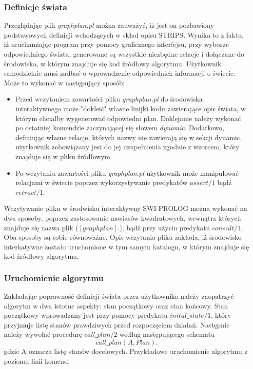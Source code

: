     \subsubsection{Definicje świata}
    Przeglądając plik \textit{graphplan.pl} można zauważyć, iż jest on pozbawiony podstawowych definicji wchodzących w skład opisu STRIPS. Wynika 
    to z faktu, iż uruchamiając program przy pomocy graficznego interfejsu, przy wyborze odpowiedniego świata, 
    generowane są wszystkie niezbędne relacje i dołączane do środowiska, w którym znajduje się kod źródłowy algorytmu.
    Użytkownik samodzielnie musi zadbać o wprowadzenie odpowiednich informacji o świecie. Może to wykonać w następujący sposób:
    \begin{itemize}
        \item Przed wczytaniem zawartości pliku \textit{graphplan.pl} do środowiska interaktywnego może "dokleić" własne linijki kodu 
        zawierające opis świata, w którym chciałby wygenerować odpowiedni plan. Doklejanie należy wykonać po ostatniej komendzie zaczynającej 
        się słowem \textit{dynamic}. Dodatkowo, definiując własne relacje, których nazwy nie zawierają się w sekcji dynamic, użytkownik 
        zobowiązany jest do jej uzupełnienia zgodnie z wzorcem, który znajduje się w pliku źródłowym
        \item Po wczytaniu zawartości pliku \textit{graphplan.pl} użytkownik może manipulować relacjami w świecie poprzez wykorzystywanie 
        predykatów $assert/1$ bądź $retract/1$. 
    \end{itemize}
    Wczytywanie pliku w środwisku interaktywny SWI-PROLOG można wykonać na dwa sposoby, poprzez zastosowanie nawiasów kwadratowych, wewnątrz których 
    znajduje się nazwa plik ($[graphplan].$), bądź przy użyciu predykatu $consult/1$. Oba sposoby są sobie równoważne. Opis wczytania pliku zakłada,
    iż środowisko interkatywne zostało uruchomione w tym samym katalogu, w którym znajduje się kod źródłowy algorytmu.
    \subsubsection{Uruchomienie algorytmu}
    Zakładając poprawność definicji świata przez użytkownika należy zaopatrzyć algorytm w dwa istotne aspekty: stan początkowy oraz stan końcowy. 
    Stan początkowy wprowadzany jest przy pomocy predykatu $inital\_state/1$, który przyjmuje listę stanów prawdziwych przed rozpoczęciem działań.
    Następnie należy wywołać procedurę $call\_plan/2$ według następującego schematu 
    \begin{equation}
        call\_plan(A,Plan).
    \end{equation}
    gdzie A oznacza listę stanów docelowych.
    Przykładowe uruchomienie algorytmu z poziomu linii komend:


